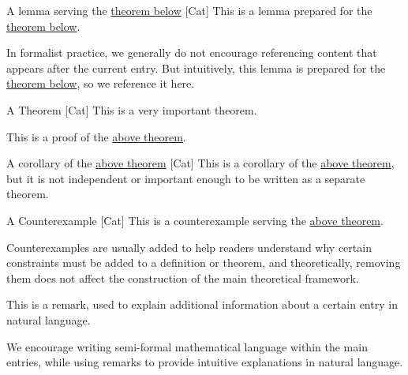 \documentclass[UTF8]{ctexart}
\begin{document}
        \begin{lma}
            [TheLemma]
            {A lemma serving the \hyperref[thm:TheTheorem]{theorem below}}
            [Cat]
            This is a lemma prepared for the \hyperref[thm:TheTheorem]{theorem below}.
            
            In formalist practice, we generally do not encourage referencing content that appears after the current entry. But intuitively, this lemma is prepared for the \hyperref[thm:TheTheorem]{theorem below}, so we reference it here.
        \end{lma}
        
        \begin{thm}
            [TheTheorem]
            {A Theorem}
            [Cat]
            This is a very important theorem.
        \end{thm}
            
        \begin{prf}
            This is a proof of the \hyperref[thm:TheTheorem]{above theorem}.
        \end{prf}
        
        \begin{crl}
            [TheCorollary]
            {A corollary of the \hyperref[thm:TheTheorem]{above theorem}}
            [Cat]
            This is a corollary of the \hyperref[thm:TheTheorem]{above theorem}, but it is not independent or important enough to be written as a separate theorem.
        \end{crl}
        
        \begin{cxmp}
            [TheCounterExample]
            {A Counterexample}
            [Cat]
            This is a counterexample serving the \hyperref[thm:TheTheorem]{above theorem}.
            
            Counterexamples are usually added to help readers understand why certain constraints must be added to a definition or theorem, and theoretically, removing them does not affect the construction of the main theoretical framework.
        \end{cxmp}
        
        \begin{rmk}
            This is a remark, used to explain additional information about a certain entry in natural language.

            We encourage writing semi-formal mathematical language within the main entries, while using remarks to provide intuitive explanations in natural language. 
        \end{rmk}
        
\end{document}
